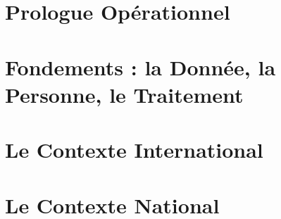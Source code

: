 \documentclass[12pt, twoside, openright, a4paper]{book}
\begin{document}
\frontmatter

    
    \cleardoublepage

    
    \cleardoublepage

    
    \cleardoublepage

    
    \cleardoublepage

    \tableofcontents
    \cleardoublepage

    \listoffigures
    \listoftables
    \cleardoublepage

\mainmatter

    \part*{Prologue Opérationnel}

        \setcounter{chapter}{-1}
        

    \part{Fondements : la Donnée, la Personne, le Traitement}
    \label{part:fondements}

        
        

    \part{Le Contexte International}
    \label{part:international}

        
        
        

    \part{Le Contexte National}
    \label{part:national}
\end{document}
